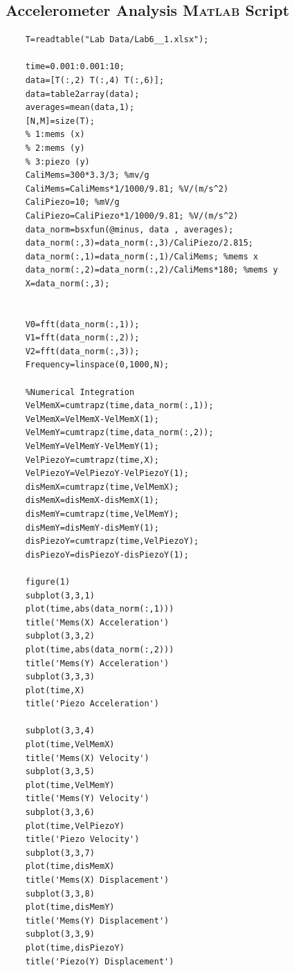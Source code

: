 \documentclass{article}
\begin{document}
\newpage
\begin{appendices}
\pagestyle{fancy}
\renewcommand{\thefigure}{A\arabic{figure}}
\setcounter{figure}{0}


\newpage

\section*{Accelerometer Analysis \textsc{Matlab} Script}
\label{accscript}
\begin{verbatim}
    T=readtable("Lab Data/Lab6__1.xlsx");

    time=0.001:0.001:10;
    data=[T(:,2) T(:,4) T(:,6)];
    data=table2array(data);
    averages=mean(data,1);
    [N,M]=size(T);
    % 1:mems (x)
    % 2:mems (y)
    % 3:piezo (y)
    CaliMems=300*3.3/3; %mv/g
    CaliMems=CaliMems*1/1000/9.81; %V/(m/s^2)
    CaliPiezo=10; %mV/g
    CaliPiezo=CaliPiezo*1/1000/9.81; %V/(m/s^2)
    data_norm=bsxfun(@minus, data , averages);
    data_norm(:,3)=data_norm(:,3)/CaliPiezo/2.815;
    data_norm(:,1)=data_norm(:,1)/CaliMems; %mems x
    data_norm(:,2)=data_norm(:,2)/CaliMems*180; %mems y
    X=data_norm(:,3);
    
    
    V0=fft(data_norm(:,1));
    V1=fft(data_norm(:,2));
    V2=fft(data_norm(:,3));
    Frequency=linspace(0,1000,N);
    
    %Numerical Integration
    VelMemX=cumtrapz(time,data_norm(:,1));
    VelMemX=VelMemX-VelMemX(1);
    VelMemY=cumtrapz(time,data_norm(:,2));
    VelMemY=VelMemY-VelMemY(1);
    VelPiezoY=cumtrapz(time,X);
    VelPiezoY=VelPiezoY-VelPiezoY(1);
    disMemX=cumtrapz(time,VelMemX);
    disMemX=disMemX-disMemX(1);
    disMemY=cumtrapz(time,VelMemY);
    disMemY=disMemY-disMemY(1);
    disPiezoY=cumtrapz(time,VelPiezoY);
    disPiezoY=disPiezoY-disPiezoY(1);
    
    figure(1)
    subplot(3,3,1)
    plot(time,abs(data_norm(:,1)))
    title('Mems(X) Acceleration')
    subplot(3,3,2)
    plot(time,abs(data_norm(:,2)))
    title('Mems(Y) Acceleration')
    subplot(3,3,3)
    plot(time,X)
    title('Piezo Acceleration')
    
    subplot(3,3,4)
    plot(time,VelMemX)
    title('Mems(X) Velocity')
    subplot(3,3,5)
    plot(time,VelMemY)
    title('Mems(Y) Velocity')
    subplot(3,3,6)
    plot(time,VelPiezoY)
    title('Piezo Velocity')
    subplot(3,3,7)
    plot(time,disMemX)
    title('Mems(X) Displacement')
    subplot(3,3,8)
    plot(time,disMemY)
    title('Mems(Y) Displacement')
    subplot(3,3,9)
    plot(time,disPiezoY)
    title('Piezo(Y) Displacement')
    

\end{verbatim}
\end{appendices}
\end{document}
